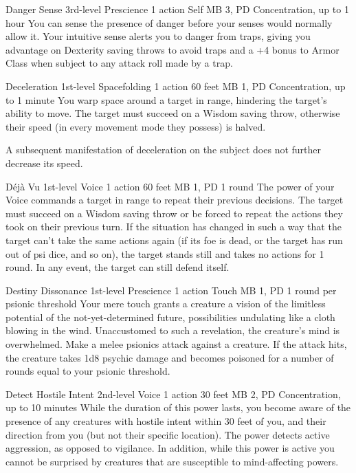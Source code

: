 \DndPowerHeader%
  {Danger Sense}
  {3rd-level Prescience}
  {1 action}
  {Self}
  {MB 3, PD \lvlthree}
  {Concentration, up to 1 hour}
  You can sense the presence of danger
  before your senses would normally allow it.
  Your intuitive sense alerts you to danger from traps,
  giving you advantage on Dexterity saving throws to avoid traps
  and a +4 bonus to Armor Class when subject to any attack roll
  made by a trap.

\DndPowerHeader%
  {Deceleration}
  {1st-level Spacefolding}
  {1 action}
  {60 feet}
  {MB 1, PD \lvlone}
  {Concentration, up to 1 minute}
You warp space around a target in range,
hindering the target's ability to move.
The target must succeed on a Wisdom saving throw,
otherwise their speed (in every movement mode they possess) is halved.

A subsequent manifestation of deceleration on the subject
does not further decrease its speed.

\DndPowerHeader%
  {Déjà Vu}
  {1st-level Voice}
  {1 action}
  {60 feet}
  {MB 1, PD \lvlone}
  {1 round}
The power of your Voice commands a target in range
to repeat their previous decisions.
The target must succeed on a Wisdom saving throw
or be forced to repeat the actions they took on their previous turn.
If the situation has changed in such a way that the target
can't take the same actions again
(if its foe is dead, or the target has run out of psi dice, and so on),
the target stands still and takes no actions for 1 round.
In any event, the target can still defend itself.

\DndPowerHeader%
  {Destiny Dissonance}
  {1st-level Prescience}
  {1 action}
  {Touch}
  {MB 1, PD \lvlone}
  {1 round per psionic threshold}
  Your mere touch grants a creature
  a vision of the limitless potential
  of the not-yet-determined future,
  possibilities undulating like a cloth blowing in the wind.
  Unaccustomed to such a revelation,
  the creature's mind is overwhelmed.
  Make a melee psionics attack against a creature.
  If the attack hits,
  the creature takes 1d8 psychic damage
  and becomes poisoned for a number of rounds
  equal to your psionic threshold.

\DndPowerHeader%
  {Detect Hostile Intent}
  {2nd-level Voice}
  {1 action}
  {30 feet}
  {MB 2, PD \lvltwo}
  {Concentration, up to 10 minutes}
  While the duration of this power lasts,
  you become aware of the presence of any creatures with hostile intent
  within 30 feet of you,
  and their direction from you
  (but not their specific location).
  The power detects active aggression,
  as opposed to vigilance.
  In addition, while this power is active you cannot be surprised
  by creatures that are susceptible to mind-affecting powers.

